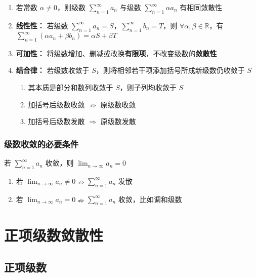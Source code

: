 \documentclass[lang = zh , final , oneside , openany , titlepage , zihao = -4 , linespread = 1.3 , baselineskip = false , cjk-font = windows , text-font = newtx , math-font = newtx , math-style = TeX]{sjtureport}
\begin{document}
\begin{enumerate}
\def\labelenumi{\arabic{enumi}.}
\item
  若常数 \(\alpha \neq 0\)，则级数
  \(\displaystyle \sum_{n=1}^\infty a_n\) 与级数
  \(\displaystyle \sum_{n=1}^\infty \alpha a_n\) 有相同敛散性
\item
  \textbf{线性性：} 若级数
  \(\displaystyle \sum_{n=1}^\infty a_n = S\)，\(\displaystyle \sum_{n=1}^\infty b_n = T\)，则
  \(\forall \alpha , \beta\in \mathbb{R}\)，有
  \(\displaystyle \sum_{n=1}^\infty (\alpha a_n + \beta b_n) = \alpha S + \beta T\)
\item
  \textbf{可加性：}
  将级数增加、删减或改换\textbf{有限项}，不改变级数的\textbf{敛散性}
\item
  \textbf{结合律：} 若级数收敛于
  \(S\)，则将相邻若干项添加括号所成新级数仍收敛于 \(S\)

  \begin{enumerate}
  \item
    其本质是部分和数列收敛于 \(S\)，则子列均收敛于 \(S\)
  \item
    加括号后级数收敛 \(\nRightarrow\) 原级数收敛
  \item
    加括号后级数发散 \(\Rightarrow\) 原级数发散
  \end{enumerate}
\end{enumerate}

\subsubsection{级数收敛的必要条件}

\begin{theorem}
    若 \(\displaystyle \sum_{n=1}^\infty a_n\) 收敛，则
\(\displaystyle \lim_{n\to\infty} a_n = 0\)
\end{theorem}

\begin{enumerate}
\item
  若
  \(\displaystyle \lim_{n\to\infty} a_n \neq 0 \nRightarrow \displaystyle \sum_{n=1}^\infty a_n\)
  发散
\item
  若
  \(\displaystyle \lim_{n\to\infty} a_n = 0 \nRightarrow \displaystyle \sum_{n=1}^\infty a_n\)
  收敛，比如调和级数
\end{enumerate}

\section{正项级数敛散性}

\subsection{正项级数}
\end{document}
